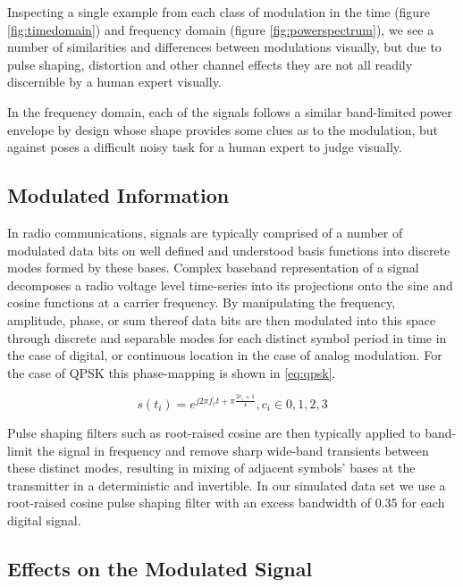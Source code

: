 \documentclass[runningheads,a4paper]{llncs}
\begin{document}
Inspecting a single example from each class of modulation in the time (figure \ref{fig:timedomain}) and frequency domain (figure \ref{fig:powerspectrum}), we see a number of similarities and differences between modulations visually, but due to pulse shaping, distortion and other channel effects they are not all readily discernible by a human expert visually. 

In the frequency domain, each of the signals follows a similar band-limited power envelope by design whose shape provides some clues as to the modulation, but against poses a difficult noisy task for a human expert to judge visually.

\subsection{Modulated Information}

In radio communications, signals are typically comprised of a number of modulated data bits on well defined and understood basis functions into discrete modes formed by these bases.  Complex baseband representation of a signal decomposes a radio voltage level time-series into its projections onto the sine and cosine functions at a carrier frequency.  By manipulating the frequency, amplitude, phase, or sum thereof data bits are then modulated into this space through discrete and separable modes for each distinct symbol period in time in the case of digital, or continuous location in the case of analog modulation.  For the case of QPSK this phase-mapping is shown in \ref{eq:qpsk}.

\begin{equation}\label{eq:qpsk}
s(t_i) = e^{j 2 \pi f_c t + \pi \frac{2 c_i + 1}{4}}, c_i \in {0, 1, 2, 3}
\end{equation}

Pulse shaping filters such as root-raised cosine are then typically applied to band-limit the signal in frequency and remove sharp wide-band transients between these distinct modes, resulting in mixing of adjacent symbols' bases at the transmitter in a deterministic and invertible.   In our simulated data set we use a root-raised cosine pulse shaping filter with an excess bandwidth of 0.35 for each digital signal.

\subsection{Effects on the Modulated Signal}
\end{document}
